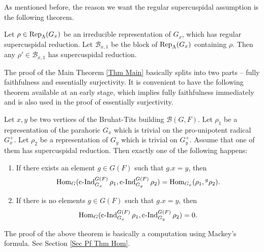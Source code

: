 		As mentioned before, the reason we want the regular supercuspidal assumption is the following theorem. 
		
		\begin{theorem}\label{Thm SC Red}
			Let $\rho \in \operatorname{\operatorname{Rep}}_{\Lambda}(G_x)$ be an irreducible representation of $G_x$, which has regular supercuspidal reduction. Let $\mathcal{B}_{x,1}$ be the block of $\operatorname{\operatorname{Rep}}_{\Lambda}(G_x)$ containing $\rho$. Then any $\rho' \in \mathcal{B}_{x,1}$ has supercuspidal reduction.
		\end{theorem}
		
		The proof of the Main Theorem \ref{Thm Main} basically splits into two parts -- fully faithfulness and essentially surjectivity. It is convenient to have the following theorem available at an early stage, which implies fully faithfulness immediately and is also used in the proof of essentially surjectivity.
		
		\begin{theorem}\label{Thm Hom}
			Let $x, y$ be two vertices of the Bruhat-Tits building $\mathcal{B}(G, F)$. Let $\rho_1$ be a representation of the parahoric $G_x$ which is trivial on the pro-unipotent radical $G_x^+$. Let $\rho_2$ be a representation of $G_y$ which is trivial on $G_y^+$. Assume that one of them has supercuspidal reduction. Then exactly one of the following happens:
			\begin{enumerate}
				\item If there exists an element $g \in G(F)$ such that $g.x=y$, then
				$$\operatorname{\operatorname{Hom}}_G(\operatorname{\operatorname{c-Ind}}_{G_x}^{G(F)}\rho_1, \operatorname{\operatorname{c-Ind}}_{G_y}^{G(F)}\rho_2)=\operatorname{\operatorname{Hom}}_{G_x}(\rho_1, {^g\rho_2}).$$
				\item If there is no elements $g \in G(F)$ such that $g.x=y$, then
				$$\operatorname{\operatorname{Hom}}_G(\operatorname{\operatorname{c-Ind}}_{G_x}^{G(F)}\rho_1, \operatorname{\operatorname{c-Ind}}_{G_y}^{G(F)}\rho_2)=0.$$
			\end{enumerate}
		\end{theorem}
		
		The proof of the above theorem is basically a computation using Mackey's formula. See Section \ref{Sec Pf Thm Hom}.
		

